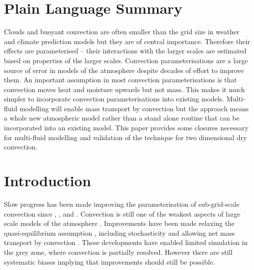 \documentclass[draft]{agujournal2019}
\begin{document}
\section*{Plain Language Summary}
Clouds and buoyant convection are often smaller than the grid size in weather and climate prediction models but they are of central importance. Therefore their effects are parameterised -- their interactions with the larger scales are estimated based on properties of the larger scales. Convection parameterisations are a large source of error in models of the atmosphere despite decades of effort to improve them. An important assumption in most convection parameterisations is that convection moves heat and moisture upwards but not mass. This makes it much simpler to incorporate convection parameterisations into existing models. Multi-fluid modelling will enable mass transport by convection but the approach means a whole new atmospheric model rather than a stand alone routine that can be incorporated into an existing model. This paper provides some closures necessary for multi-fluid modelling and validation of the technique for two dimensional dry convection.

\section{Introduction}

Slow progress has been made improving the parameterisation of sub-grid-scale
convection since , ,  and . Convection is still
one of the weakest aspects of large scale models of the atmosphere
\cite{HPB+14,SAB+13,ipcc41}. Improvements have been made  relaxing
the quasi-equilibrium assumption \cite{PR98,GG05,Par14}, including
stochasticity \cite{PC08} and allowing net mass transport by convection
\cite{KB08,MB19}. These developments have enabled limited simulation
in the grey zone, where convection is partially resolved. However
there are still systematic biases implying that improvements should
still be possible.
\end{document}
